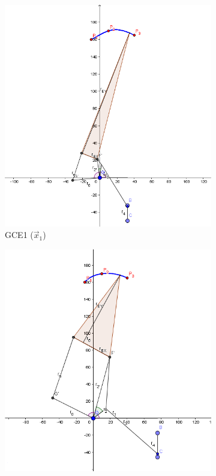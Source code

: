 \begin{figure}
	\centering
	\begin{subfigure}[b]{0.45\linewidth}
		\includegraphics[width=\linewidth]{Figures/GCE1}
		\caption{GCE1 ($\vec{x}_1$)} \label{fig:G1} 
	\end{subfigure}
	\begin{subfigure}[b]{0.45\linewidth}
	\includegraphics[width=\linewidth]{Figures/GCE1_2}

\end{subfigure}
\end{figure}
